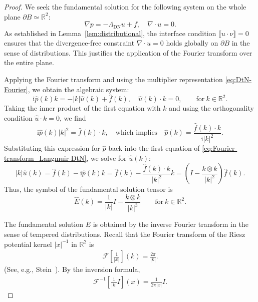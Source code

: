 \documentclass{article}
\theoremstyle{remark}
\theoremstyle{definition}
\numberwithin{equation}{section}
\begin{document}
\begin{proof}
    We seek the fundamental solution for the following system on the whole plane $\partial B \simeq \mathbb{R}^2$:
    \begin{equation*}
        \nabla p=-\Lambda_{\mathrm{DN}}u+f,\quad\nabla\cdot u=0.
    \end{equation*}
    As established in Lemma~\ref{lem:distributional}, the interface condition $\llbracket u \cdot \nu \rrbracket = 0$ ensures that the divergence-free constraint $\nabla \cdot u = 0$ holds globally on $\partial B$ in the sense of distributions. This justifies the application of the Fourier transform over the entire plane.

    Applying the Fourier transform and using the multiplier representation \eqref{eq:DtN-Fourier}, we obtain the algebraic system:
    \begin{equation}
        \mathrm{i}\hat{p}(k)k=-|k|\hat{u}(k)+\hat{f}(k),\quad
        \hat{u}(k)\cdot k=0,\qquad
        \text{for}\ k\in\mathbb{R}^2.
    \label{eq:Fourier-transform_Langmuir-DtN}
    \end{equation}
    Taking the inner product of the first equation with $k$ and using the orthogonality condition $\hat{u}\cdot k = 0$, we find
    \begin{equation*}
        \mathrm{i}\hat{p}(k)|k|^2=\hat{f}(k)\cdot k,\quad\text{which implies}\quad\hat{p}(k)=\frac{\hat{f}(k)\cdot k}{\mathrm{i}|k|^2}.
    \end{equation*}
    Substituting this expression for $\hat{p}$ back into the first equation of \eqref{eq:Fourier-transform_Langmuir-DtN}, we solve for $\hat{u}(k)$:
    \begin{equation*}
        |k|\hat{u}(k) = \hat{f}(k) - \mathrm{i}\hat{p}(k)k = \hat{f}(k) - \frac{\hat{f}(k)\cdot k}{|k|^2}k = \left(I-\frac{k\otimes k}{|k|^2}\right)\hat{f}(k).
    \end{equation*}
    Thus, the symbol of the fundamental solution tensor is
    \begin{equation*}
        \hat{E}(k)=\frac{1}{|k|}I-\frac{k\otimes k}{|k|^3}\qquad\text{for}\ k\in\mathbb{R}^2.
    \end{equation*}
    
    The fundamental solution $E$ is obtained by the inverse Fourier transform in the sense of tempered distributions.
    Recall that the Fourier transform of the Riesz potential kernel $|x|^{-1}$ in $\mathbb{R}^2$ is
    \begin{align*}
        \mathcal{F}\left[\frac{1}{|x|}\right](k) = \frac{2\pi}{|k|}.
    \end{align*}
    (See, e.g., Stein~\cite[Chapter~V, Section~1, Lemma~1]{stein1970singular}). By the inversion formula,
    \begin{align}
        \mathcal{F}^{-1}\left[\frac{1}{|k|}I\right](x) = \frac{1}{2\pi|x|}I.
    \label{eq:inv_Fourier_1}
    \end{align}


\end{proof}
\end{document}
